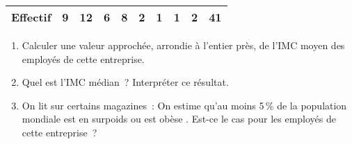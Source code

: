 \begin{enumerate}
\begin{center}
\begin{tabular}{|c|c|c|c|c|c|c|c|c|c|}
               Effectif &9 &12&6 &8 &2 &1 &1 &2 &41\\ \hline
          \end{tabular}
     \end{center}
     \begin{enumerate}[label=\alph*.]
          \item Calculer une valeur approchée, arrondie à l'entier près, de l'IMC moyen des employés de cette
          entreprise.
          \item Quel est l'IMC médian~? Interpréter ce résultat.
          \item On lit sur certains magazines~: \og On estime qu'au moins 5\,\% de la population mondiale est en surpoids ou est obèse \fg. Est-ce le cas pour les employés de cette entreprise~?
     \end{enumerate}
\end{enumerate}
